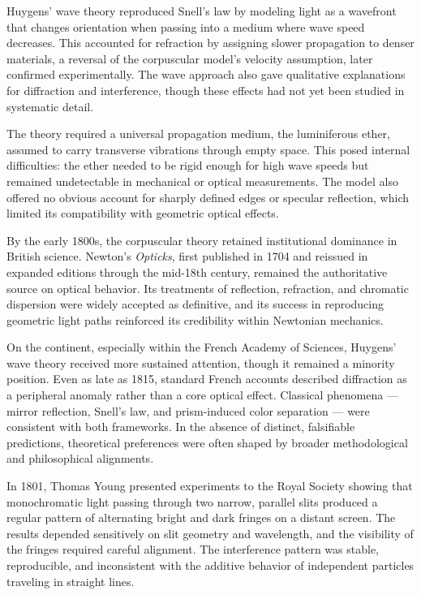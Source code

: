 Huygens’ wave theory reproduced Snell’s law by modeling light as a wavefront that changes orientation when passing into a medium where wave speed decreases. This accounted for refraction by assigning slower propagation to denser materials, a reversal of the corpuscular model’s velocity assumption, later confirmed experimentally. The wave approach also gave qualitative explanations for diffraction and interference, though these effects had not yet been studied in systematic detail.

The theory required a universal propagation medium, the luminiferous ether, assumed to carry transverse vibrations through empty space. This posed internal difficulties: the ether needed to be rigid enough for high wave speeds but remained undetectable in mechanical or optical measurements. The model also offered no obvious account for sharply defined edges or specular reflection, which limited its compatibility with geometric optical effects.

By the early 1800s, the corpuscular theory retained institutional dominance in British science. Newton’s \textit{Opticks}, first published in 1704 and reissued in expanded editions through the mid-18th century, remained the authoritative source on optical behavior. Its treatments of reflection, refraction, and chromatic dispersion were widely accepted as definitive, and its success in reproducing geometric light paths reinforced its credibility within Newtonian mechanics.

On the continent, especially within the French Academy of Sciences, Huygens’ wave theory received more sustained attention, though it remained a minority position. Even as late as 1815, standard French accounts described diffraction as a peripheral anomaly rather than a core optical effect. Classical phenomena — mirror reflection, Snell’s law, and prism-induced color separation — were consistent with both frameworks. In the absence of distinct, falsifiable predictions, theoretical preferences were often shaped by broader methodological and philosophical alignments.

In 1801, Thomas Young presented experiments to the Royal Society showing that monochromatic light passing through two narrow, parallel slits produced a regular pattern of alternating bright and dark fringes on a distant screen. The results depended sensitively on slit geometry and wavelength, and the visibility of the fringes required careful alignment. The interference pattern was stable, reproducible, and inconsistent with the additive behavior of independent particles traveling in straight lines.

